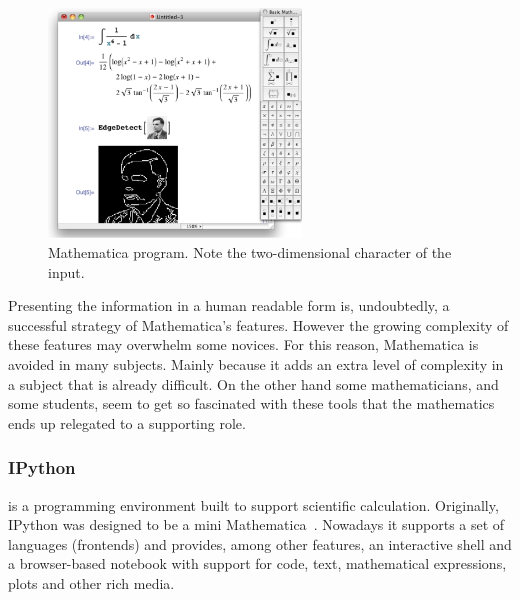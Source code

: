 \begin{figure}
  \vspace{-35pt}
  \begin{center}
    \includegraphics[width=0.6\textwidth]{img/mathematica}
  \end{center}
  \vspace{-23pt}
 \caption{Mathematica program. Note the two-dimensional character of the input.}  
  \vspace{-25pt}
    \label{fig:math}
\end{figure}

Presenting the information in a human readable form is, undoubtedly, a successful strategy of Mathematica's features. However the growing complexity of these features may overwhelm some novices. For this reason, Mathematica is avoided in many subjects. Mainly because it adds an extra level of complexity in a subject that is already difficult. On the other hand some mathematicians, and some students, seem to get so fascinated with these tools that the mathematics ends up relegated to a supporting role.
\subsubsection{IPython~\cite{PER-GRA:2007}} is a programming environment built to support scientific calculation. Originally, IPython was designed to be a mini Mathematica~\cite{wolfram1991mathematica}. Nowadays it supports a set of languages (frontends) and provides, among other features, an interactive shell and a browser-based notebook with support for code, text, mathematical expressions, plots and other rich media. 

